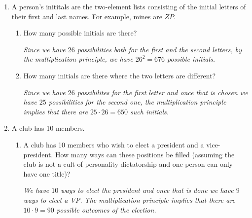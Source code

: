 \documentclass[11pt]{preprint}
\begin{document}
\begin{enumerate}

\item A person's inititals are the two-element lists consisting of the initial letters of their first and last names. For example, mines are $ZP$. 
\begin{enumerate}
\item How many possible initials are there?

\vspace{0.1cm}
\textit{Since we have $26$ possibilities both for the first and the second letters, by the multiplication principle, we have $26^2=676$ possible initials.}
\vspace{0.1cm}

\item How many initials are there where the two letters are different?

\vspace{0.1cm}
\textit{Since we have $26$ possibilites for the first letter and once that is chosen we have $25$ possibilities for the second one, the multiplication principle implies that there are $25\cdot 26=650$ such initials.}
\vspace{0.1cm}
\end{enumerate}
\item A club has 10 members.
\begin{enumerate}
\item A club has 10 members who wish to elect a president and a vice-president. How many ways can these positions be filled (assuming the club is not a cult-of personality dictatorship and one person can only have one title)?

\vspace{0.1cm}
\textit{We have $10$ ways to elect the president and once that is done we have $9$ ways to elect a VP. The multiplication principle implies that there are $10\cdot 9 = 90$ possible outcomes of the election.}
\vspace{0.1cm}


\end{enumerate}
\end{enumerate}
\end{document}
